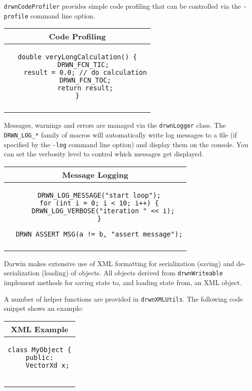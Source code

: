 \documentclass[landscape,8pt]{article}
\newcommand{\thickhline}{\noalign{\hrule height 0.8pt}}
\begin{document}
\begin{multicols}{3}
\texttt{drwnCodeProfiler} provides simple code profiling that can be
controlled via the \texttt{-profile} command line option.

\begin{tabular}{c}
\thickhline
{\sc Code Profiling}\\
\hline
\begin{minipage}[h]{0.95\columnwidth}
\smallskip
\begin{verbatim}
double veryLongCalculation() {
    DRWN_FCN_TIC; 
    result = 0.0; // do calculation
    DRWN_FCN_TOC;
    return result;
}
\end{verbatim}
\smallskip
\end{minipage}\\
\thickhline
\end{tabular}
\smallskip

Messages, warnings and errors are managed via the \texttt{drwnLogger}
class. The \texttt{DRWN\_LOG\_*} family of macros will automatically
write log messages to a file (if specified by the \texttt{-log}
command line option) and display them on the console. You can set the
verbosity level to control which messages get displayed.

\begin{tabular}{c}
\thickhline
{\sc Message Logging}\\
\hline
\begin{minipage}[h]{0.95\columnwidth}
\smallskip
\begin{verbatim}
  DRWN_LOG_MESSAGE("start loop");
  for (int i = 0; i < 10; i++) {
    DRWN_LOG_VERBOSE("iteration " << i);
  }

  DRWN_ASSERT_MSG(a != b, "assert message");
\end{verbatim}
\smallskip
\end{minipage}\\
\thickhline
\end{tabular}
\smallskip

{\sc Darwin} makes extensive use of XML formatting for serialization
(saving) and de-serialization (loading) of objects. All objects
derived from \texttt{drwnWriteable} implement methods for saving state
to, and loading state from, an XML object.

A number of helper functions are provided in
\texttt{drwnXMLUtils}. The following code snippet shows an example:

\begin{tabular}{c}
\thickhline
{\sc XML Example}\\
\hline
\begin{minipage}[h]{0.95\columnwidth}
\smallskip
\begin{verbatim}
class MyObject {
public:
    VectorXd x;


\end{verbatim}
\end{minipage}
\end{tabular}
\end{multicols}
\end{document}

